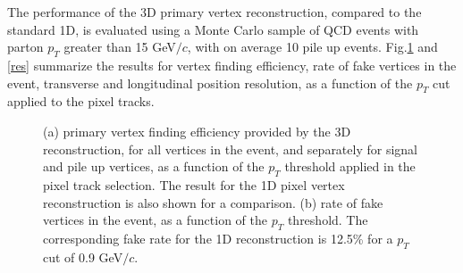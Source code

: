 The performance of the 3D primary vertex reconstruction, compared to the standard 1D, is evaluated using a Monte Carlo sample of QCD events with parton $p_{T}$ greater than 15 GeV$/c$, with on average 10 pile up events. 
Fig.\ref{efffake} and \ref{res} summarize the results for vertex finding efficiency, rate of fake vertices in the event, transverse and longitudinal position resolution, as a function of the $p_{T}$ cut applied to the pixel tracks.
\begin{figure}
   \centering
   \hspace{0.1cm}
   \caption{\small{(a) primary vertex finding efficiency provided by the 3D reconstruction, for all vertices in the event, and separately for signal and pile up vertices, as a function of the $p_{T}$ threshold applied in the pixel track selection. The result for the 1D pixel vertex reconstruction is also shown for a comparison. (b) rate of fake vertices in the event, as a function of the $p_{T}$ threshold. The corresponding fake rate for the 1D reconstruction is 12.5\% for a $p_{T}$ cut of 0.9 GeV$/c$.}}
   \label{efffake}                  %
\end{figure}
